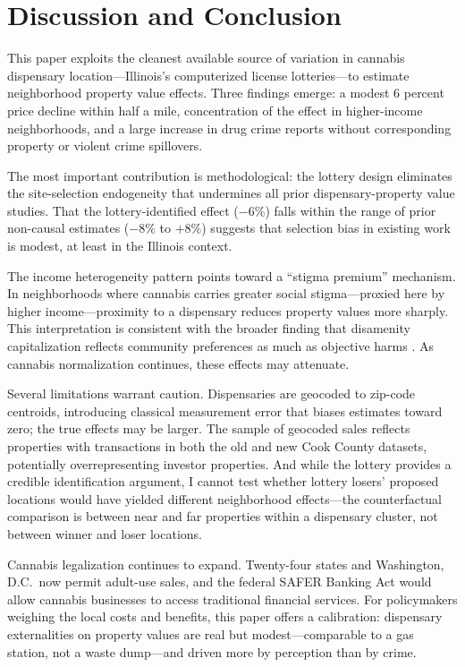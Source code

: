 \documentclass[12pt]{article}
\begin{document}
\section{Discussion and Conclusion}

This paper exploits the cleanest available source of variation in cannabis dispensary location---Illinois's computerized license lotteries---to estimate neighborhood property value effects. Three findings emerge: a modest 6 percent price decline within half a mile, concentration of the effect in higher-income neighborhoods, and a large increase in drug crime reports without corresponding property or violent crime spillovers.

The most important contribution is methodological: the lottery design eliminates the site-selection endogeneity that undermines all prior dispensary-property value studies. That the lottery-identified effect ($-6\%$) falls within the range of prior non-causal estimates ($-8\%$ to $+8\%$) suggests that selection bias in existing work is modest, at least in the Illinois context.

The income heterogeneity pattern points toward a ``stigma premium'' mechanism. In neighborhoods where cannabis carries greater social stigma---proxied here by higher income---proximity to a dispensary reduces property values more sharply. This interpretation is consistent with the broader finding that disamenity capitalization reflects community preferences as much as objective harms \citep{pope2008}. As cannabis normalization continues, these effects may attenuate.

Several limitations warrant caution. Dispensaries are geocoded to zip-code centroids, introducing classical measurement error that biases estimates toward zero; the true effects may be larger. The sample of geocoded sales reflects properties with transactions in both the old and new Cook County datasets, potentially overrepresenting investor properties. And while the lottery provides a credible identification argument, I cannot test whether lottery losers' proposed locations would have yielded different neighborhood effects---the counterfactual comparison is between near and far properties within a dispensary cluster, not between winner and loser locations.

Cannabis legalization continues to expand. Twenty-four states and Washington, D.C.\ now permit adult-use sales, and the federal SAFER Banking Act would allow cannabis businesses to access traditional financial services. For policymakers weighing the local costs and benefits, this paper offers a calibration: dispensary externalities on property values are real but modest---comparable to a gas station, not a waste dump---and driven more by perception than by crime.
\end{document}
